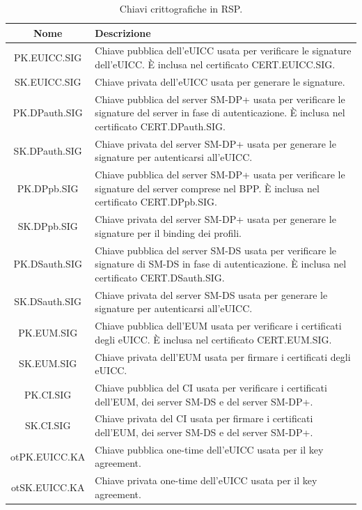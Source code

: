 \documentclass[10pt, oneside]{book}
\begin{document}
\begin{table}[h!]
\begin{center}
\captionsetup{skip=4pt}
\caption{Chiavi crittografiche in RSP.}
\label{tab:keys}
\begin{tabularx}{\textwidth}{|c|X|}
\hline
\textbf{Nome} & \textbf{Descrizione}\\
\hline
PK.EUICC.SIG & Chiave pubblica dell'eUICC usata per verificare le signature dell'eUICC. È inclusa nel certificato CERT.EUICC.SIG.\\
\hline
SK.EUICC.SIG & Chiave privata dell'eUICC usata per generare le signature.\\
\hline
PK.DPauth.SIG & Chiave pubblica del server SM-DP+ usata per verificare le signature del server in fase di autenticazione. È inclusa nel certificato CERT.DPauth.SIG.\\
\hline
SK.DPauth.SIG & Chiave privata del server SM-DP+ usata per generare le signature per autenticarsi all'eUICC.\\
\hline
PK.DPpb.SIG & Chiave pubblica del server SM-DP+ usata per verificare le signature del server comprese nel BPP.  È inclusa nel certificato CERT.DPpb.SIG.\\
\hline
SK.DPpb.SIG & Chiave privata del server SM-DP+ usata per generare le signature per il binding dei profili.\\
\hline
PK.DSauth.SIG & Chiave pubblica del server SM-DS usata per verificare le signature di SM-DS in fase di autenticazione. È inclusa nel certificato CERT.DSauth.SIG.\\
\hline
SK.DSauth.SIG & Chiave privata del server SM-DS usata per generare le signature per autenticarsi all'eUICC.\\
\hline
PK.EUM.SIG & Chiave pubblica dell'EUM usata per verificare i certificati degli eUICC. È inclusa nel certificato CERT.EUM.SIG.\\
\hline
SK.EUM.SIG & Chiave privata dell'EUM usata per firmare i certificati degli eUICC.\\
\hline
PK.CI.SIG &  Chiave pubblica del CI usata per verificare i certificati dell'EUM, dei server SM-DS e del server SM-DP+.\\
\hline
SK.CI.SIG & Chiave privata del CI usata per firmare i certificati dell'EUM, dei server SM-DS e del server SM-DP+.\\
\hline
otPK.EUICC.KA & Chiave pubblica one-time dell'eUICC usata per il key agreement.\\
\hline
otSK.EUICC.KA & Chiave privata one-time dell'eUICC usata per il key agreement.\\

\end{tabularx}
\end{center}
\end{table}
\end{document}
